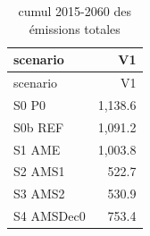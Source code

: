 \documentclass[]{article}
\begin{document}
\begin{longtable}[]{@{}lr@{}}
\caption{cumul 2015-2060 des émissions totales}\tabularnewline
\toprule
\begin{minipage}[b]{0.17\columnwidth}\raggedright\strut
scenario\strut
\end{minipage} & \begin{minipage}[b]{0.12\columnwidth}\raggedleft\strut
V1\strut
\end{minipage}\tabularnewline
\midrule
\endfirsthead
\toprule
\begin{minipage}[b]{0.17\columnwidth}\raggedright\strut
scenario\strut
\end{minipage} & \begin{minipage}[b]{0.12\columnwidth}\raggedleft\strut
V1\strut
\end{minipage}\tabularnewline
\midrule
\endhead
\begin{minipage}[t]{0.17\columnwidth}\raggedright\strut
S0 P0\strut
\end{minipage} & \begin{minipage}[t]{0.12\columnwidth}\raggedleft\strut
1,138.6\strut
\end{minipage}\tabularnewline
\begin{minipage}[t]{0.17\columnwidth}\raggedright\strut
S0b REF\strut
\end{minipage} & \begin{minipage}[t]{0.12\columnwidth}\raggedleft\strut
1,091.2\strut
\end{minipage}\tabularnewline
\begin{minipage}[t]{0.17\columnwidth}\raggedright\strut
S1 AME\strut
\end{minipage} & \begin{minipage}[t]{0.12\columnwidth}\raggedleft\strut
1,003.8\strut
\end{minipage}\tabularnewline
\begin{minipage}[t]{0.17\columnwidth}\raggedright\strut
S2 AMS1\strut
\end{minipage} & \begin{minipage}[t]{0.12\columnwidth}\raggedleft\strut
522.7\strut
\end{minipage}\tabularnewline
\begin{minipage}[t]{0.17\columnwidth}\raggedright\strut
S3 AMS2\strut
\end{minipage} & \begin{minipage}[t]{0.12\columnwidth}\raggedleft\strut
530.9\strut
\end{minipage}\tabularnewline
\begin{minipage}[t]{0.17\columnwidth}\raggedright\strut
S4 AMSDec0\strut
\end{minipage} & \begin{minipage}[t]{0.12\columnwidth}\raggedleft\strut
753.4\strut
\end{minipage}\tabularnewline
\bottomrule
\end{longtable}
\end{document}
